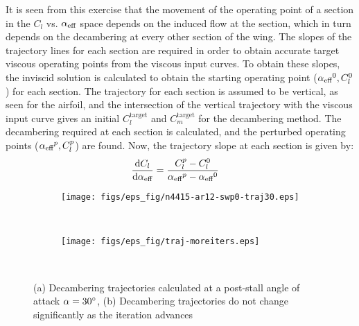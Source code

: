 It is seen from this exercise that the movement of the operating point of a section in the $C_l$ vs. $\alpha_\text{eff}{}$ space depends on the induced flow at the section, which in turn depends on the decambering at every other section of the wing.
The slopes of the trajectory lines for each section are required in order to obtain accurate target viscous operating points from the viscous input curves.
To obtain these slopes, the inviscid solution is calculated to obtain the starting operating point ($\alpha_\text{eff}{}^0, C_{l}^0$) for each section.
The trajectory for each section is assumed to be vertical, as seen for the airfoil, and the intersection of the vertical trajectory with the viscous input curve gives an initial $C_{l}^\text{target}$ and $C_{m}^\text{target}$ for the decambering method. The decambering required at each section is calculated, and the perturbed operating points ($\alpha_\text{eff}{}^p, C_{l}^p$) are found. Now, the trajectory slope at each section is given by:
\begin{align}
    \frac{\text{d}C_l}{\text{d}\alpha_\text{eff}{}} &= \frac{C_l^p - C_l^0}{\alpha_\text{eff}{}^p - \alpha_\text{eff}{}^0}
\end{align}


\begin{figure*}[!h]
    \begin{subfigure}[t]{0.45\textwidth}
        \centering
        \texttt{[image: figs/eps\_fig/n4415-ar12-swp0-traj30.eps]}
        \caption{}
        \label{fig:n4415-ar12-swp0-traj30}
    \end{subfigure}%
    ~
    \begin{subfigure}[t]{0.45\textwidth}
        \centering
        \texttt{[image: figs/eps\_fig/traj-moreiters.eps]}
        \caption{}
        \label{fig:traj-moreiters}
    \end{subfigure}%
    ~
    \caption{(a) Decambering trajectories calculated at a post-stall angle of attack $\alpha = 30^\circ{}$, (b) Decambering trajectories do not change significantly as the iteration advances}
\end{figure*}


